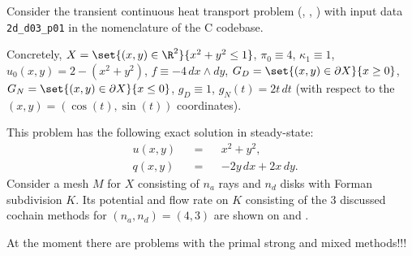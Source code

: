 \begin{example}
  \label{idec/diffusion/continuous/transient/examples/2d_d03_p01-example}
  Consider the transient continuous heat transport problem
  (,
   ,
   )
  with input data \verb|2d_d03_p01| in the nomenclature of the C codebase.

  Concretely,
    $X = \set{(x, y) \in \R^2}{x^2 + y^2 \leq 1}$,
    $\pi_0 \equiv 4$,
    $\kappa_1 \equiv 1$,
    $u_0(x, y) = 2 - (x^2 + y^2)$,
    $f \equiv -4\, d x \wedge d y$,
    $G_D = \set{(x, y) \in \partial X}{x \geq 0}$,
    $G_N = \set{(x, y) \in \partial X}{x \leq 0}$,
    $g_D \equiv 1$,
    $g_N(t) = 2 t \, d t$
    (with respect to the $(x, y) = (\cos(t), \sin(t))$ coordinates).

  This problem has the following exact solution in steady-state:
  \begin{subequations}
    \begin{alignat}{3}
      & u(x, y) && = && x^2 + y^2, \\
      & q(x, y) && = && -2 y\, d x + 2 x\, d y.
    \end{alignat}
  \end{subequations}
  Consider a mesh $M$ for $X$ consisting of $n_a$ rays and $n_d$ disks
  with Forman subdivision $K$.
  Its potential and flow rate on $K$ consisting of the $3$ discussed cochain
  methods for $(n_a, n_d) = (4, 3)$ are shown on
  and
  .

  {\color{red} At the moment there are problems with the primal strong and mixed
  methods!!!}
\end{example}
